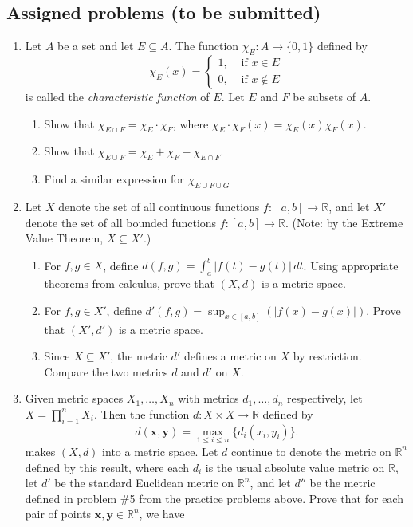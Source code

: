 \documentclass[letterpaper,12pt]{article}
\newcommand{\abs}[1]{\lvert #1\rvert}
\newcommand{\R}{\mathbb{R}}
\newcommand{\x}{\mathbf{x}}
\newcommand{\y}{\mathbf{y}}
\begin{document}
\subsection*{Assigned problems (to be submitted)}
\begin{enumerate}
 \item Let $A$ be a set and let $E\subseteq A$. The function $\chi_E:A\to\{0,1\}$ defined by
\[
 \chi_E(x) = \begin{cases}1, & \text{ if } x\in E\\ 0, & \text{ if } x\notin E\end{cases}
\]
is called the {\em characteristic function} of $E$. Let $E$ and $F$ be subsets of $A$.
\begin{enumerate}
 \item Show that $\chi_{E\cap F} = \chi_E\cdot \chi_F$, where $\chi_E\cdot\chi_F(x) = \chi_E(x)\chi_F(x)$.
 \item Show that $\chi_{E\cup F} = \chi_E+\chi_F-\chi_{E\cap F}$.
 \item Find a similar expression for $\chi_{E\cup F\cup G}$
\end{enumerate}
\item Let $X$ denote the set of all continuous functions $f:[a,b]\to\R$, and let $X'$ denote the set of all bounded functions $f:[a,b]\to\R$. (Note: by the Extreme Value Theorem, $X\subseteq X'$.)
\begin{enumerate}
 \item For $f,g\in X$, define $d(f,g) = \int_a^b\abs{f(t)-g(t)}\,dt$. Using appropriate theorems from calculus, prove that $(X,d)$ is a metric space.
 \item For $f,g\in X'$, define $d'(f,g) = \sup_{x\in [a,b]}(\abs{f(x)-g(x)})$. Prove that $(X',d')$ is a metric space.
 \item Since $X\subseteq X'$, the metric $d'$ defines a metric on $X$ by restriction. Compare the two metrics $d$ and $d'$ on $X$.
\end{enumerate}
 \item Given metric spaces $X_1,\ldots, X_n$ with metrics $d_1,\ldots, d_n$ respectively, let $X = \prod_{i=1}^nX_i$. Then the function $d:X\times X\to \R$ defined by 
\[
 d(\x,\y) = \max_{1\leq i\leq n}\{d_i(x_i,y_i)\}.
\]
makes $(X,d)$ into a metric space. Let $d$ continue to denote the metric on $\R^n$ defined by this result, where each $d_i$ is the usual absolute value metric on $\R$, let $d'$ be the standard Euclidean metric on $\R^n$, and let $d''$ be the metric defined in problem \#5 from the practice problems above. Prove that for each pair of points $\x,\y\in\R^n$, we have

\end{enumerate}
\end{document}
